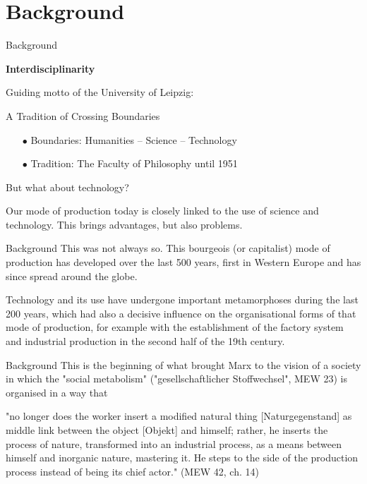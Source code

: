 \documentclass{beamer}
\title{Modelling Sustainable Systems\\ and Semantic Web\\[6pt] Introduction
  \vskip1em}
\subtitle{Lecture in the Module 10-202-2309\\ for Master Computer Science}
\author{Prof. Dr. Hans-Gert Gräbe\\
\url{http://www.informatik.uni-leipzig.de/~graebe}}
\date{April 2021}
\newcommand{\ueberschrift}[1]{\begin{center}\bf #1\end{center}}
\begin{document}
{
\begin{frame}
  \titlepage
\end{frame}}

\section{Background}
\begin{frame}{Background}

\ueberschrift{Interdisciplinarity}

Guiding motto of the University of Leipzig:
\begin{center}
  A Tradition of Crossing Boundaries
\end{center}

\begin{itemize}
\item[$\bullet$]  Boundaries: Humanities -- Science -- Technology
\item[$\bullet$]  Tradition: The Faculty of Philosophy until 1951
\end{itemize}

But what about technology?

Our mode of production today is closely linked to the use of science and
technology. This brings advantages, but also problems.
\end{frame}

\begin{frame}{Background}
This was not always so. This bourgeois (or capitalist) mode of production has
developed over the last 500 years, first in Western Europe and has since
spread around the globe.

Technology and its use have undergone important metamorphoses during the last
200 years, which had also a decisive influence on the organisational forms of
that mode of production, for example with the establishment of the factory
system and industrial production in the second half of the 19th century.
\end{frame}

\begin{frame}{Background}
This is the beginning of what brought Marx to the vision of a society in which
the "social metabolism" ("gesellschaftlicher Stoffwechsel", MEW 23) is
organised in a way that

"no longer does the worker insert a modified natural thing [Naturgegenstand] as
middle link between the object [Objekt] and himself; rather, he inserts the
process of nature, transformed into an industrial process, as a means between
himself and inorganic nature, mastering it. He steps to the side of the
production process instead of being its chief actor." (MEW 42, ch. 14)
\end{frame}
\end{document}
